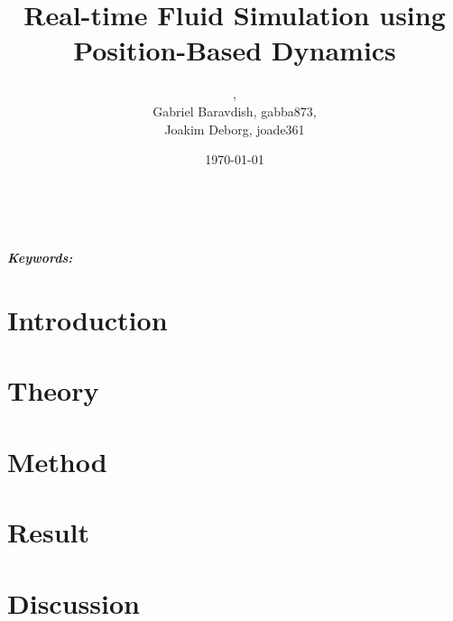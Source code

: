 \documentclass[a4paper, 11pt]{article} %
\title{\textbf{Real-time Fluid Simulation using Position-Based Dynamics}}
\author{\vspace{-1.2cm}{Niklas Andersson, nikan278},
\\{Gabriel Baravdish, gabba873},
\\{Joakim Deborg, joade361}}
\date{\today} %
\makeatletter
\providecommand{\keywords}[1]{\textbf{\textit{Keywords:}} #1}
\renewcommand{\maketitle}{ %
\begin{center} 
{\LARGE\@title} %

\vspace{50pt} %

{\large\@author} %
\\\@date %

\vspace{40pt} %
\end{center}
}
\makeatother
\begin{document}
\maketitle %



\vspace{-1.2cm}

\begin{abstract}

\end{abstract}

\noindent \keywords{}

\vspace{30pt} %


\newpage

\tableofcontents

\newpage

\section{Introduction}


\section{Theory}


\section{Method}


\section{Result}


\section{Discussion}



\newpage






\end{document}

